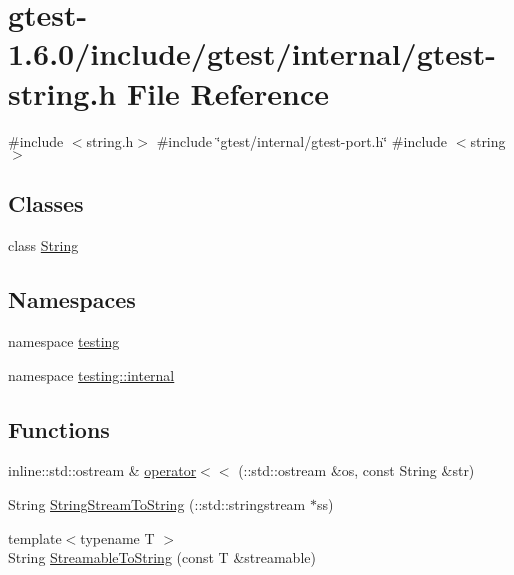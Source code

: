 \hypertarget{gtest-string_8h}{\section{gtest-\/1.6.0/include/gtest/internal/gtest-\/string.h \-File \-Reference}
\label{d0/d45/gtest-string_8h}
}
{\ttfamily \#include $<$string.\-h$>$}\*
{\ttfamily \#include \char`\"{}gtest/internal/gtest-\/port.\-h\char`\"{}}\*
{\ttfamily \#include $<$string$>$}\*
\subsection*{\-Classes}
\begin{DoxyCompactItemize}
\item 
class \hyperlink{classtesting_1_1internal_1_1String}{\-String}
\end{DoxyCompactItemize}
\subsection*{\-Namespaces}
\begin{DoxyCompactItemize}
\item 
namespace \hyperlink{namespacetesting}{testing}
\item 
namespace \hyperlink{namespacetesting_1_1internal}{testing\-::internal}
\end{DoxyCompactItemize}
\subsection*{\-Functions}
\begin{DoxyCompactItemize}
\item 
inline\-::std\-::ostream \& \hyperlink{namespacetesting_1_1internal_aef0e96aa2c28064d8dbc6d0465aeed40}{operator$<$$<$} (\-::std\-::ostream \&os, const \-String \&str)
\item 
\-String \hyperlink{namespacetesting_1_1internal_abf99dee8db2ca5a9bc512dd6cc34f048}{\-String\-Stream\-To\-String} (\-::std\-::stringstream $\ast$ss)
\item 
{\footnotesize template$<$typename T $>$ }\\\-String \hyperlink{namespacetesting_1_1internal_a66c1c8bcb19e8562b79bd8ef9bab2aa9}{\-Streamable\-To\-String} (const \-T \&streamable)
\end{DoxyCompactItemize}
